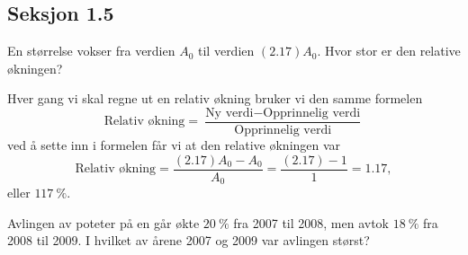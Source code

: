 \documentclass[a4paper,11pt]{article}
\begin{document}
\newpageLF


\subsection*{Seksjon 1.5}


\begin{problem}[1]
  \label{problem:1.5-1-oving-02-2019-MAT-0001}
  En størrelse vokser fra verdien $A_0$ til verdien $(\num{2.17})A_0$. Hvor
  stor er den relative økningen? 
\end{problem}

\begin{solution}
  Hver gang vi skal regne ut en relativ økning bruker vi den samme formelen
  \begin{equation*}
    \text{Relativ økning} 
    = \frac{\text{Ny verdi} %
    - \text{Opprinnelig verdi}}{\text{Opprinnelig verdi}}
  \end{equation*}
  ved å sette inn i formelen får vi at den relative økningen var
  \begin{equation*}
    \text{Relativ økning} 
    = \frac{(\num{2.17})A_0 - A_0}{A_0}
    = \frac{(\num{2.17}) - 1}{1}
    = \num{1.17},
  \end{equation*}
  eller $\SI{117}{\percent}$.
\end{solution}


\begin{problem}[3]
  \label{problem:1.5-3-oving-02-2019-MAT-0001}
  Avlingen av poteter på en går økte $\SI{20}{\percent}$ fra 2007 til 2008,
  men avtok $\SI{18}{\percent}$ fra 2008 til 2009. I hvilket av årene 2007 og
  2009 var avlingen størst? 
\end{problem} 
\end{document}
